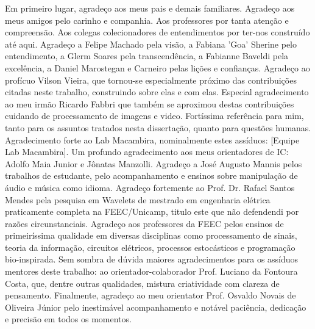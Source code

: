 Em primeiro lugar, agradeço aos meus pais e demais familiares. Agradeço aos
meus amigos pelo carinho e companhia. Aos professores por tanta atenção e compreensão.
Aos colegas colecionadores de entendimentos por ter-nos construído até aqui.
Agradeço a Felipe Machado pela visão, a Fabiana 'Goa' Sherine pelo entendimento,
a Glerm Soares pela transcendência, a Fabianne Baveldi pela excelência, a Daniel
Marostegan e Carneiro pelas lições e confianças. Agradeço ao profícuo Vilson Vieira, que tornou-se especialmente próximo
das contribuições citadas neste trabalho, construindo sobre elas e com elas. Especial agradecimento
ao meu irmão Ricardo Fabbri que também se aproximou destas contribuições cuidando de processamento de imagens e video. Fortíssima referência
para mim, tanto para os assuntos tratados nesta dissertação, quanto para questões humanas. Agradecimento
forte ao Lab Macambira, nominalmente estes assíduos: [Equipe Lab Macambira]. Um profundo agradecimento
aos meus orientadores de IC: Adolfo Maia Junior e Jônatas Manzolli. Agradeço a José Augusto Mannis
pelos trabalhos de estudante, pelo acompanhamento e ensinos sobre manipulação de áudio e música como idioma.
Agradeço fortemente ao Prof. Dr. Rafael Santos Mendes pela pesquisa em Wavelets de mestrado em engenharia elétrica
praticamente completa na FEEC/Unicamp, titulo este que não defendendi por razões circunstanciais. Agradeço aos professores da FEEC pelos ensinos de
primeiríssima qualidade em diversas disciplinas como processamento de sinais, teoria da informação, 
circuitos elétricos, processos estocásticos
e programação bio-inspirada. Sem sombra de dúvida maiores agradecimentos para os assíduos mentores
deste trabalho: ao orientador-colaborador Prof. Luciano da Fontoura Costa, que, dentre outras qualidades,
mistura criatividade com clareza de pensamento. Finalmente, agradeço ao meu 
orientator Prof. Osvaldo Novais de Oliveira Júnior pelo inestimável acompanhamento
e notável paciência, dedicação e precisão em todos os momentos.